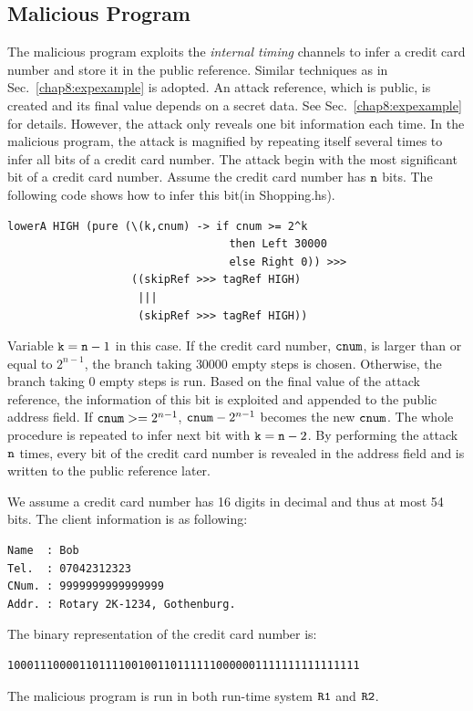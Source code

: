 \documentclass[a4paper]{report}
\newcommand{\co}[1]{$\cod{#1}$}
\begin{document}
\subsection{Malicious Program}
The malicious program exploits the {\em internal timing} channels to infer a credit card number and store it
in the public reference. Similar techniques as in Sec.~\ref{chap8:expexample} is adopted. 
An attack reference, which is public, is created and its final value depends on a secret data.
See Sec.~\ref{chap8:expexample} for details.
However, the attack only reveals one bit information each time. In the malicious program, the attack
is magnified by repeating itself several times to infer all bits of a credit card number. 
The attack begin with the most significant bit of a credit card number. Assume the credit card number has
\co{n} bits. The following code shows how to infer this bit(in Shopping.hs).
\begin{Verbatim}[fontsize=\footnotesize]
lowerA HIGH (pure (\(k,cnum) -> if cnum >= 2^k 
                                  then Left 30000 
                                  else Right 0)) >>>
                   ((skipRef >>> tagRef HIGH)
                    |||
                    (skipRef >>> tagRef HIGH))
\end{Verbatim}
Variable $\mathtt{k} =\mathtt{n} -1$ in this case. If the credit card number, \co{cnum}, is larger than or equal to $2^{n-1}$, 
the branch taking $30000$ empty steps is chosen. Otherwise, the branch taking $0$ empty steps is run.  
Based on the final value of the attack reference, the information of this 
bit is exploited and appended to the public address field. 
If $\mathtt{cnum} >=2^{n-1}$, $\mathtt{cnum} -2^{n-1}$ becomes the new \co{cnum}. The whole procedure
is repeated to infer next bit with $\mathtt{k} =\mathtt{n} -2$.
By performing the attack \co{n} times, every bit of the credit card number is revealed in the address field and 
is written to the public reference later.

We assume a credit card number has 16 digits in decimal and thus at most 54 bits. 
The client information is as following:
\begin{Verbatim}[fontsize=\footnotesize]
Name  : Bob
Tel.  : 07042312323
CNum. : 9999999999999999
Addr. : Rotary 2K-1234, Gothenburg.
\end{Verbatim}
The binary representation of the credit card number is:
\begin{Verbatim}[fontsize=\footnotesize]
100011100001101111001001101111110000001111111111111111
\end{Verbatim}
The malicious program is run in both run-time system \co{R1} and \co{R2}. 
\end{document}
